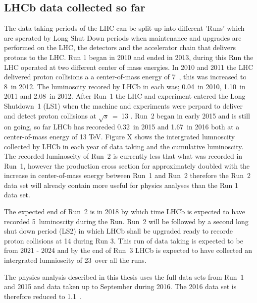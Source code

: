 \subsection{LHCb data collected so far}
\label{LHCb_data}
The data taking periods of the LHC can be split up into different 'Runs' which are sperated by Long Shut Down periods when maintenance and upgrades are performed on the LHC, the detectors and the accelerator chain that delivers protons to the LHC. Run 1 began in 2010 and ended in 2013, during this Run the LHC operated at two different center of mass energies. In 2010 and 2011 the LHC delivered proton collisions a a center-of-mass energy of 7~\tev, this was increased to 8~\tev in 2012. The luminoscity recored by LHCb in each was; 0.04~\fb in 2010, 1.10~\fb in 2011 and 2.08~\fb in 2012. After Run~1 the LHC and experiment entered the Long Shutdown~1 (LS1) when the machine and experiments were perpard to deliver and detect proton collisions at $\sqrt{s}$~=~13 . Run~2 began in early 2015 and is still on going, so far LHCb has recoreded 0.32~\fb in 2015 and 1.67~\fb in 2016 both at a center-of-mass energy of 13 TeV. Figure X shows the intergrated lumnoscity collected by LHCb in each year of data taking and the cumulative luminoscity. The recorded luminoscity of Run~2 is currently less that what was recorded in Run~1, however the production cross section for \bhadrons approximately doubled with the increase in center-of-mass energy between Run~1 and Run~2 therefore the Run~2 data set will already contain more \bhadrons useful for physics analyses than the Run 1 data set. 


The expected end of Run~2 is in 2018 by which time LHCb is expected to have recorded 5~\fb luminoscity during the Run. Run~2 will be followed by a second long shut down period (LS2) in which LHCb shall be upgraded ready to recorde proton collisions at 14 \tev during Run 3. This run of data taking is expected to be from 2021 - 2024 and by the end of Run~3 LHCb is expected to have collected an intergrated lumnioscity of 23~\fb over all the runs. 

The physics analysis described in this thesis uses the full data sets from Run~1 and 2015 and data taken up to September during 2016. The 2016 data set is therefore reduced to 1.1~\fb.

